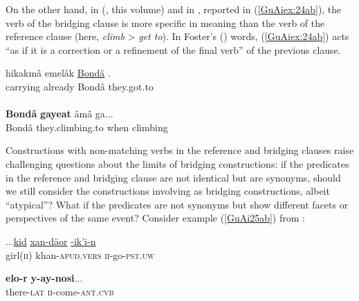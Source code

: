 \documentclass[output=paper]{LSP/langsci}
\begin{document}
On the other hand, in  (\citeauthor{jarkey18}, this volume) and in , reported in (\ref{GuAiex:24ab}), the verb of the bridging clause is more specific in meaning than the verb of the reference clause (here, \textit{climb} > \textit{get to}). In Foster’s (\citeyear{foster81}) words, (\ref{GuAiex:24ab}) acts ``as if it is a correction or a refinement of the final verb'' of the previous clause.


\begin{exe}
\ex \label{GuAiex:24ab}
\begin{xlist}
\ex \label{GuAiex:24a}
\gll hikakmâ   emelâk \underline{Bondâ} \underline{}. \\
carrying   already Bondâ they.got.to\\
\glt {} \\
\ex \label{GuAiex:24b}
\gll  \textbf{Bondâ } \textbf{gayeat}     âmâ   ga...\\
 Bondâ they.climbing.to   when   climbing \\
\glt {}
\end{xlist}
\end{exe}


Constructions with non-matching verbs in the reference and bridging clauses raise challenging questions about the limits of bridging constructions: if the predicates in the reference and bridging clause are not identical but are synonyms, should we still consider the constructions involving  as bridging constructions, albeit ``atypical''? What if the predicates are not synonyms but show different facets or perspectives of the same event? Consider example (\ref{GuAi25ab}) from :

\begin{exe}
	\ex	\label{GuAi25ab}
	\begin{xlist}
		\ex	\label{GuAi25a}
		\gll	...\underline{kid}  	\underline{xan-däor}   		\underline{-ik’i-n}\\
			 girl(\textsc{ii}) 	khan-\textsc{apud.vers} 	\textsc{ii}-go-\textsc{pst.uw} \\
		\glt	{}

		\ex	\label{GuAi25b}
		\gll			\textbf{elo-r}    	\textbf{y-ay-nosi}... \\
			there-\textsc{lat}	\textsc{ii}-come-\textsc{ant.cvb} 	  \\
		\glt	{}
	\end{xlist}
\end{exe}
\end{document}
